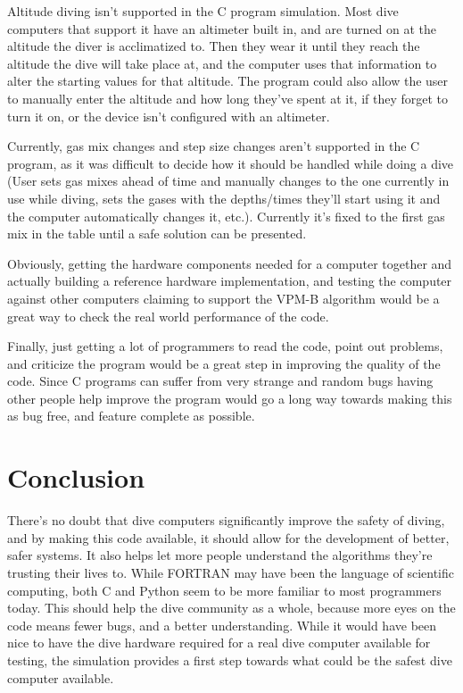 \documentclass[12pt]{article}
\begin{document}
Altitude diving isn't supported in the C program simulation. Most dive computers that support it
have an altimeter built in, and are turned on at the altitude the diver is acclimatized to. Then
they wear it until they reach the altitude the dive will take place at, and the computer uses that
information to alter the starting values for that altitude. The program could also allow the user
to manually enter the altitude and how long they've spent at it, if they forget to turn it on, or
the device isn't configured with an altimeter.

Currently, gas mix changes and step size changes aren't supported in the C program, as it was difficult
to decide how it should be handled while doing a dive (User sets gas mixes ahead of time and manually changes
to the one currently in use while diving, sets the gases with the depths/times they'll start using it and the
computer automatically changes it, etc.). Currently it's fixed to the first gas mix in the table
until a safe solution can be presented.

Obviously, getting the hardware components needed for a computer together and actually building a reference
hardware implementation, and testing the computer against other computers claiming to support the VPM-B
algorithm would be a great way to check the real world performance of the code.

Finally, just getting a lot of programmers to read the code, point out problems, and criticize the program
 would be a great step in improving the quality of the code. Since C programs can suffer from
very strange and random bugs having other people help improve the program would go a long way towards making this
as bug free, and feature complete as possible.

\section{Conclusion}

There's no doubt that dive computers significantly improve the safety of diving, and by making this code
available, it should allow for the development of better, safer systems. It also helps let more
people understand the algorithms they're trusting their lives to. While FORTRAN may have been the language
of scientific computing, both C and Python seem to be more familiar to most programmers today. This should
help the dive community as a whole, because more eyes on the code means fewer bugs, and a better understanding.
While it would have been nice to have the dive hardware required for a real dive computer available for testing,
the simulation provides a first step towards what could be the safest dive computer available.
\end{document}
